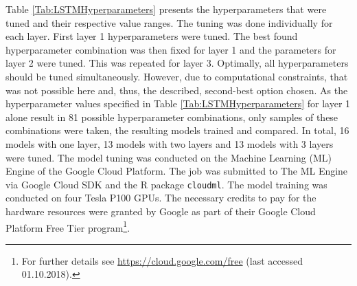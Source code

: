 Table \ref{Tab:LSTMHyperparameters} presents the hyperparameters that were tuned and their respective value ranges. The tuning was done individually for each layer. First layer 1 hyperparameters were tuned. The best found hyperparameter combination was then fixed for layer 1 and the parameters for layer 2 were tuned. This was repeated for layer 3. Optimally, all hyperparameters should be tuned simultaneously. However, due to computational constraints, that was not possible here and, thus, the described, second-best option chosen. As the hyperparameter values specified in Table \ref{Tab:LSTMHyperparameters} for layer 1 alone result in 81 possible hyperparameter combinations, only samples of these combinations were taken, the resulting models trained and compared. In total, 16 models with one layer, 13 models with two layers and 13 models with 3 layers were tuned. The model tuning was conducted on the Machine Learning (ML) Engine of the Google Cloud Platform. The job was submitted to The ML Engine via Google Cloud SDK and the R package \texttt{cloudml}. The model training was conducted on four Tesla P100 GPUs. The necessary credits to pay for the hardware resources were granted by Google as part of their Google Cloud Platform Free Tier program\footnote{For further details see \href{https://cloud.google.com/free}{https://cloud.google.com/free} (last accessed 01.10.2018).}.

